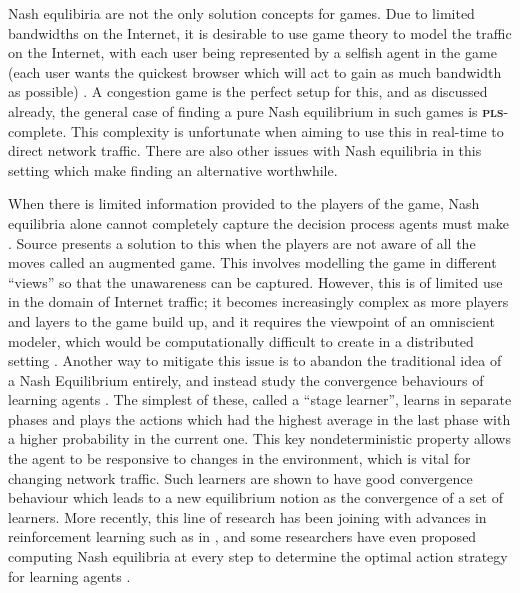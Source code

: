 \documentclass{article}
\begin{document}
\begin{multicols}{2}
Nash equlibiria are not the only solution concepts for games. Due to limited bandwidths on the Internet, it is desirable to use game theory to model the traffic on the Internet, with each user being represented by a selfish agent in the game (each user wants the quickest browser which will act to gain as much bandwidth as possible) \cite{friedman_learning_nodate}. A congestion game is the perfect setup for this, and as discussed already, the general case of finding a pure Nash equilibrium in such games is \textbf{\textsc{pls}}-complete. This complexity is unfortunate when aiming to use this in real-time to direct network traffic. There are also other issues with Nash equilibria in this setting which make finding an alternative worthwhile.

When there is limited information provided to the players of the game, Nash equilibria alone cannot completely capture the decision process agents must make \cite{friedman_learning_nodate, beyond_nash}. Source \cite{beyond_nash} presents a solution to this when the players are not aware of all the moves called an augmented game. This involves modelling the game in different ``views'' so that the unawareness can be captured. However, this is of limited use in the domain of Internet traffic; it becomes increasingly complex as more players and layers to the game build up, and it requires the viewpoint of an omniscient modeler, which would be computationally difficult to create in a distributed setting \cite{friedman_learning_nodate}. Another way to mitigate this issue is to abandon the traditional idea of a Nash Equilibrium entirely, and instead study the convergence behaviours of learning agents \cite{friedman_learning_nodate}. The simplest of these, called a ``stage learner'', learns in separate phases and plays the actions which had the highest average in the last phase with a higher probability in the current one. This key nondeterministic property allows the agent to be responsive to changes in the environment, which is vital for changing network traffic. Such learners are shown to have good convergence behaviour which leads to a new equilibrium notion as the convergence of a set of learners. More recently, this line of research has been joining with advances in reinforcement learning such as in \cite{nowe_game_2012}, and some researchers have even proposed computing Nash equilibria at every step to determine the optimal action strategy for learning agents \cite{lee_nash_2019}.


\end{multicols}
\end{document}
